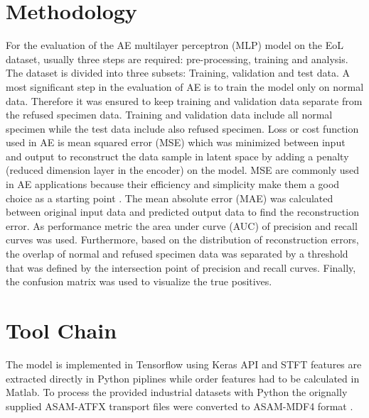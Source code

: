 \documentclass[a4paper, 10pt, twocolumn]{article}
\begin{document}
\section*{Methodology}
\label{sec:Methodology}
For the evaluation of the AE multilayer perceptron (MLP) model on the EoL dataset, usually three steps are required: pre-processing, training and analysis. The dataset is divided into three subsets: Training,  validation and test data. A most significant step in the evaluation of AE is to train the model only on normal data. Therefore it was ensured to keep training and validation data separate from the refused specimen data. Training and validation data include all normal specimen while the test data include also refused specimen. Loss or cost function used in AE is mean squared error (MSE) which was minimized between input and output to reconstruct the data sample in latent space by adding a penalty (reduced dimension layer in the encoder) on the model. MSE are commonly used in AE applications because their efficiency and simplicity make them a good choice as a starting point \cite{b5}. The mean absolute error (MAE) was calculated between original input data and predicted output data to find the reconstruction error. As performance metric the area under curve (AUC) of precision and recall curves was used. Furthermore, based on the distribution of reconstruction errors, the overlap of normal and refused specimen data was separated by a threshold that was defined by the intersection point of precision and recall curves. Finally, the confusion matrix was used to visualize the true positives.


\section*{Tool Chain}
\label{sec:Toolschain}
 The model is implemented in Tensorflow using Keras API and STFT features are extracted directly in Python piplines while order features had to be calculated in Matlab. To process the provided industrial datasets with Python the orignally supplied ASAM-ATFX transport files were converted to ASAM-MDF4 format \cite{b6}.     
 
\end{document}

